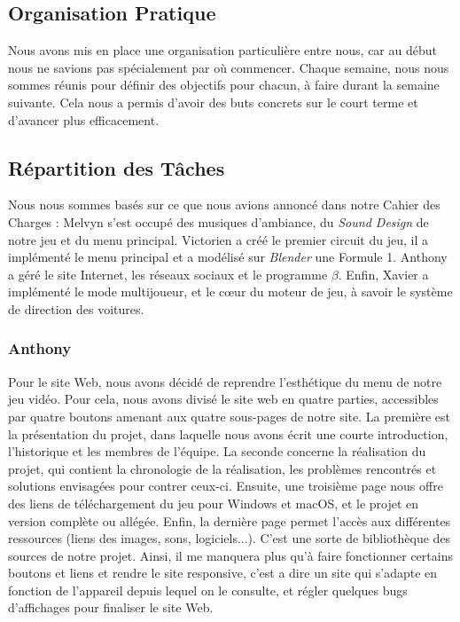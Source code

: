 \documentclass[12pt,a4paper]{article}
\begin{document}
    \subsection{Organisation Pratique}
        Nous avons mis en place une organisation particulière entre nous,
        car au début nous ne savions pas spécialement par où commencer.
        Chaque semaine, nous nous sommes réunis pour définir des 
        objectifs pour chacun, à faire durant la semaine suivante. Cela nous 
        a permis d’avoir des buts concrets sur le court terme et d'avancer plus 
        efficacement.

    \subsection{Répartition des Tâches}
        Nous nous sommes basés sur ce que nous avions annoncé dans notre Cahier des Charges :
        Melvyn s'est occupé des musiques d'ambiance, du \textit{Sound Design} de 
        notre jeu et du menu principal. Victorien a créé le premier circuit du jeu,
        il a implémenté le menu principal et a modélisé sur \textsl{Blender} une Formule 1.
        Anthony a géré le site Internet, les réseaux sociaux et le programme \(\beta\).
        Enfin, Xavier a implémenté le mode multijoueur, et le cœur du moteur de jeu,
        à savoir le système de direction des voitures.

    \subsubsection{Anthony}
        Pour le site Web, nous avons décidé de reprendre l'esthétique du
        menu de notre jeu vidéo. Pour cela, nous avons divisé le site web 
        en quatre parties, accessibles par quatre boutons amenant aux quatre 
        sous-pages de notre site. La première est la présentation du projet, dans laquelle
        nous avons écrit une courte introduction, l'historique et les membres
        de l'équipe. La seconde concerne la réalisation du projet, qui contient
        la chronologie de la réalisation, les problèmes rencontrés et solutions
        envisagées pour contrer ceux-ci. Ensuite, une troisième page nous 
        offre des liens de téléchargement du jeu pour Windows et macOS, et
        le projet en version complète ou allégée.
        Enfin, la dernière page permet l'accès aux différentes ressources
        (liens des images, sons, logiciels...). C'est une sorte de bibliothèque 
        des sources de notre projet.
        Ainsi, il me manquera plus qu'à faire fonctionner certains boutons et 
        liens et rendre le site responsive, c'est a dire un site qui s'adapte en 
        fonction de l'appareil depuis lequel on le consulte, et 
        régler quelques bugs d'affichages pour finaliser le site Web. 
    
\end{document}
